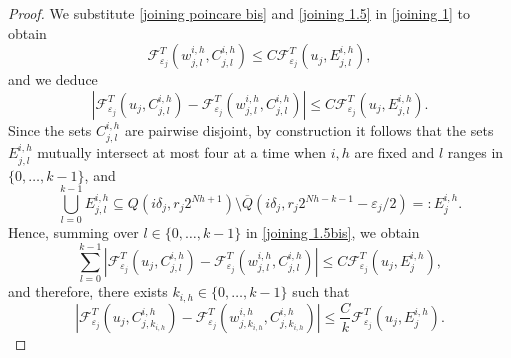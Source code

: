 \documentclass{article}
\theoremstyle{plain}
\theoremstyle{definition}
\newcommand{\ej}{\varepsilon_j}
\newcommand{\rj}{r_j}
\newcommand{\dej}{\delta_j}
\newcommand{\F}{\mathcal{F}}
\newcommand{\Q}
{\overline{Q}}
\numberwithin{equation}{section}
\begin{document}
\begin{proof}
We substitute \eqref{joining poincare bis} and \eqref{joining 1.5} in \eqref{joining 1} to obtain
        \begin{equation*}
     \F^T_{\ej}(w_{j,l}^{i,h},C^{i, h}_{j,l}) \leq  C\F^T_{\ej}(u_j,E^{i, h}_{j,l}),
     \end{equation*}
and we deduce
     \begin{equation}\label{joining 1.5bis}
          |\F^T_{\ej}(u_j,C_{j,l}^{i,h})-\F^T_{\ej}(w_{j,l}^{i,h},C_{j,l}^{i,h})|\leq C \F^T_{\ej}(u_j,E_{j,l}^{i,h}).
     \end{equation}
Since the sets $C_{j,l}^{i,h}$ are pairwise disjoint, by construction it follows that the sets $E^{i,h}_{j,l}$ mutually intersect at most four at a time when $i,h$ are fixed and $l$ ranges in $\{0,\dots,k-1\}$, and  
     \begin{equation*}
      \bigcup_{l=0}^{k-1}E^{i,h}_{j,l}\subseteq Q(i\dej, \rj2^{Nh+1})\setminus \Q(i\dej, \rj2^{Nh-k-1}-\ej/2)    =: E^{i,h}_j.
     \end{equation*}
     Hence, summing over $l\in\{0,\dots,k-1\}$ in \eqref{joining 1.5bis}, we obtain
     \begin{equation*}
         \sum_{l=0}^{k-1} |\F^T_{\ej}(u_j,C_{j,l}^{i,h})-\F^T_{\ej}(w_{j,l}^{i,h},C_{j,l}^{i,h})| \leq C\F^T_{\ej}(u_j,E_j^{i,h}),
     \end{equation*}
and therefore, there exists $k_{i,h}\in\{0,\dots,k-1\}$ such that
\begin{equation}\label{joining 2}
     |\F^T_{\ej}(u_j,C_{j,k_{i,h}}^{i,h})-\F^T_{\ej}(w_{j,k_{i,h}}^{i,h},C_{j,k_{i,h}}^{i,h})| \leq \frac{C}{k}\F^T_{\ej}(u_j,E_j^{i,h}).
\end{equation}


\end{proof}
\end{document}
